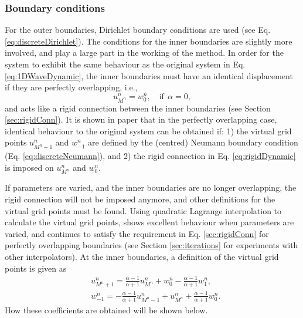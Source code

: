 \subsubsection{Boundary conditions}
For the outer boundaries, Dirichlet boundary conditions are used (see Eq. \eqref{eq:discreteDirichlet}).
The conditions for the inner boundaries are slightly more involved, and play a large part in the working of the method. 
In order for the system to exhibit the same behaviour as the original system in Eq. \eqref{eq:1DWaveDynamic}, the inner boundaries must have an identical displacement if they are perfectly overlapping, i.e.,
\begin{equation}\label{eq:rigidDynamic}
    u_{M^n}^n = w_0^n, \quad \text{if}\ \ \alpha = 0,
\end{equation}
and acts like a rigid connection between the inner boundaries (see Section \ref{sec:rigidConn}). It is shown in paper \citeP[G] that in the perfectly overlapping case, identical behaviour to the original system can be obtained if: 1) the virtual grid points $u_{M^n+1}^n$ and $w_{-1}^n$ are defined by the (centred) Neumann boundary condition (Eq. \eqref{eq:discreteNeumann}), and 2) the rigid connection in Eq. \eqref{eq:rigidDynamic} is imposed on $u_{M^n}^n$ and $w_0^n$. 

If parameters are varied, and the inner boundaries are no longer overlapping, the rigid connection will not be imposed anymore, and other definitions for the virtual grid points must be found. Using quadratic Lagrange interpolation to calculate the virtual grid points, shows excellent behaviour when parameters are varied, and continues to satisfy the requirement in Eq. \eqref{sec:rigidConn} for perfectly overlapping boundaries (see Section \ref{sec:iterations} for experiments with other interpolators). At the inner boundaries, a definition of the virtual grid points is given as
\begin{subequations}\label{eq:connectionInterpol}
    \begin{align}
            &u_{M^n+1}^n = \frac{\alpha - 1}{\alpha + 1}u_{M^n}^n + w_0^n - \frac{\alpha - 1}{\alpha + 1}w_1^n,
        \label{eq:calcUMP1}\\
            &w_{-1}^n = -\frac{\alpha - 1}{\alpha + 1}u_{M^n-1}^n + u_{M^n}^n+ \frac{\alpha - 1}{\alpha + 1}w_{0}^n.\label{eq:calcWM1}
    \end{align}
\end{subequations}
How these coefficients are obtained will be shown below. 


